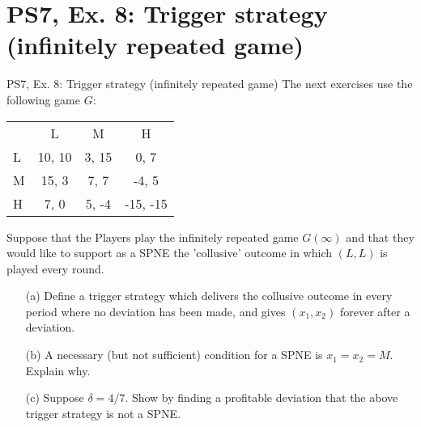 \section{PS7, Ex. 8: Trigger strategy (infinitely repeated game)}

\begin{frame}{PS7, Ex. 8: Trigger strategy (infinitely repeated game)}
  The next exercises use the following game $G$:
  \begin{table}
    \begin{tabular}{l|c|c|c|}
      \multicolumn{1}{c}{} & \multicolumn{1}{c}{L} & \multicolumn{1}{c}{M} & \multicolumn{1}{c}{H} \\\cline{2-4}
      L & 10, 10 & 3, 15 & 0, 7 \\\cline{2-4}
      M & 15, 3 & 7, 7 & -4, 5 \\\cline{2-4}
      H & 7, 0 & 5, -4 & -15, -15 \\\cline{2-4}
    \end{tabular}
  \end{table}
  Suppose that the Players play the infinitely repeated game $G(\infty)$ and that they would like to support as a SPNE the 'collusive' outcome in which $(L, L)$ is played every round.
  \begin{itemize}
    \item[(a)] Define a trigger strategy which delivers the collusive outcome in every period where no deviation has been made, and gives $(x_1, x_2)$ forever after a deviation.
    \item[(b)] A necessary (but not sufficient) condition for a SPNE is $x_1 = x_2 = M$. Explain why.
    \vspace{-4pt} \item[(c)] Suppose $\delta = 4/7$. Show by finding a profitable deviation that the above trigger strategy is not a SPNE. \vspace{-6pt}
  \end{itemize}
\end{frame}

